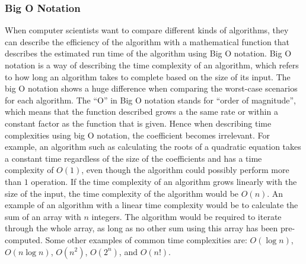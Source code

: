\documentclass{article}
\begin{document}
\subsubsection{Big O Notation}\label{Big O}
When computer scientists want to compare different kinds of algorithms, they can describe the efficiency of the algorithm with a mathematical function that describes the estimated run time of the algorithm using Big O notation. Big O notation is a way of describing the time complexity of an algorithm, which refers to how long an algorithm takes to complete based on the size of its input. The big O notation shows a huge difference when comparing the worst-case scenarios for each algorithm.
\newline
The ``O'' in Big O notation stands for ``order of magnitude'', which means that the function described grows a the same rate or within a constant factor as the function that is given. Hence when describing time complexities using big O notation, the coefficient becomes irrelevant. For example, an algorithm such as calculating the roots of a quadratic equation takes a constant time regardless of the size of the coefficients and has a time complexity of $O(1)$, even though the algorithm could possibly perform more than $1$ operation. If the time complexity of an algorithm grows linearly with the size of the input, the time complexity of the algorithm would be $O(n)$. An example of an algorithm with a linear time complexity would be to calculate the sum of an array with $n$ integers. The algorithm would be required to iterate through the whole array, as long as no other sum using this array has been pre-computed. Some other examples of common time complexities are: $O(\log{n})$, $O(n \log{n})$, $O(n^2)$, $O(2^n)$, and $O(n!)$.
\end{document}
